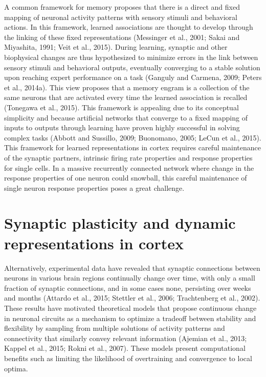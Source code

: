 A common framework for memory proposes that there is a direct and fixed mapping of neuronal activity patterns with sensory stimuli and behavioral actions. In this framework, learned associations are thought to develop through the linking of these fixed representations (Messinger et al., 2001; Sakai and Miyashita, 1991; Veit et al., 2015). During learning, synaptic and other biophysical changes are thus hypothesized to minimize errors in the link between sensory stimuli and behavioral outputs, eventually converging to a stable solution upon reaching expert performance on a task (Ganguly and Carmena, 2009; Peters et al., 2014a). This view proposes that a memory engram is a collection of the same neurons that are activated every time the learned association is recalled (Tonegawa et al., 2015). This framework is appealing due to its conceptual simplicity and because artificial networks that converge to a fixed mapping of inputs to outputs through learning have proven highly successful in solving complex tasks (Abbott and Sussillo, 2009; Buonomano, 2005; LeCun et al., 2015). This framework for learned representations in cortex requires careful maintenance of the synaptic partners, intrinsic firing rate properties and response properties for single cells. In a massive recurrently connected network where change in the response properties of one neuron could snowball, this careful maintenance of single neuron response properties poses a great challenge.

\section{Synaptic plasticity and dynamic representations in cortex} 
Alternatively, experimental data have revealed that synaptic connections between neurons in various brain regions continually change over time, with only a small fraction of synaptic connections, and in some cases none, persisting over weeks and months (Attardo et al., 2015; Stettler et al., 2006; Trachtenberg et al., 2002). These results have motivated theoretical models that propose continuous change in neuronal circuits as a mechanism to optimize a tradeoff between stability and flexibility by sampling from multiple solutions of activity patterns and connectivity that similarly convey relevant information (Ajemian et al., 2013; Kappel et al., 2015; Rokni et al., 2007). These models present computational benefits such as limiting the likelihood of overtraining and convergence to local optima.
 
